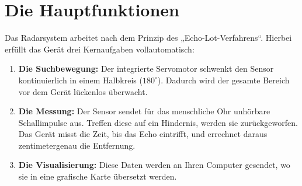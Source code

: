 %
%

\chapter{Die Hauptfunktionen}

Das Radarsystem arbeitet nach dem Prinzip des „Echo-Lot-Verfahrens“. Hierbei erfüllt das Gerät drei Kernaufgaben vollautomatisch:

\begin{enumerate}
	\item \textbf{Die Suchbewegung:} Der integrierte Servomotor schwenkt den Sensor kontinuierlich in einem Halbkreis ($180^\circ$). Dadurch wird der gesamte Bereich vor dem Gerät lückenlos überwacht.
	\item \textbf{Die Messung:} Der Sensor sendet für das menschliche Ohr unhörbare Schallimpulse aus. Treffen diese auf ein Hindernis, werden sie zurückgeworfen. Das Gerät misst die Zeit, bis das Echo eintrifft, und errechnet daraus zentimetergenau die Entfernung.
	\item \textbf{Die Visualisierung:} Diese Daten werden an Ihren Computer gesendet, wo sie in eine grafische Karte übersetzt werden.

\end{enumerate}
